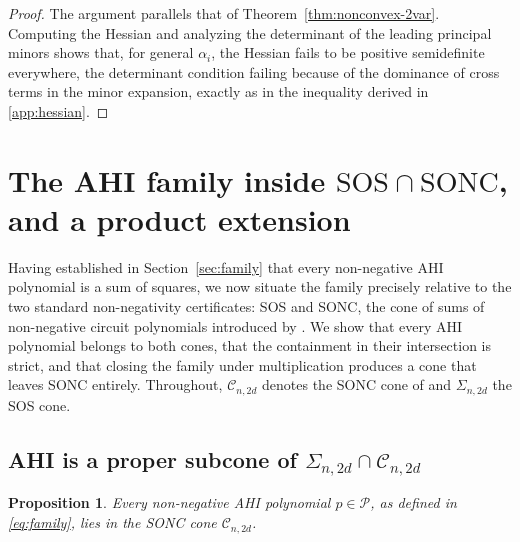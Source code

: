 \documentclass[12pt]{elsarticle}
\newtheorem{proposition}[theorem]{Proposition}
\theoremstyle{definition}
\newcommand{\SONC}{\mathcal{C}}
\begin{document}
\begin{proof}
The argument parallels that of Theorem~\ref{thm:nonconvex-2var}. Computing the Hessian and analyzing the determinant of the leading principal minors shows that, for general $\alpha_i$, the Hessian fails to be positive semidefinite everywhere, the determinant condition failing because of the dominance of cross terms in the minor expansion, exactly as in the inequality derived in \ref{app:hessian}.
\end{proof}

\section{The AHI family inside \texorpdfstring{$\mathrm{SOS}\cap\mathrm{SONC}$}{SOS cap SONC}, and a product extension}\label{sec:cones}

Having established in Section~\ref{sec:family} that every non-negative AHI polynomial is a sum of squares, we now situate the family precisely relative to the two standard non-negativity certificates: SOS and SONC, the cone of sums of non-negative circuit polynomials introduced by \citet{iliman2016amoebas}. We show that every AHI polynomial belongs to both cones, that the containment in their intersection is strict, and that closing the family under multiplication produces a cone that leaves SONC entirely. Throughout, $\SONC_{n,2d}$ denotes the SONC cone of \citep[Definition~1.3]{iliman2016amoebas} and $\Sigma_{n,2d}$ the SOS cone.

\subsection{AHI is a proper subcone of \texorpdfstring{$\Sigma_{n,2d}\cap\SONC_{n,2d}$}{SOS cap SONC}}\label{subsec:ahi-in-both}

\begin{proposition}\label{prop:ahi-in-sonc}
Every non-negative AHI polynomial $p \in \mathcal{P}$, as defined in \eqref{eq:family}, lies in the SONC cone $\SONC_{n,2d}$.
\end{proposition}
\end{document}
